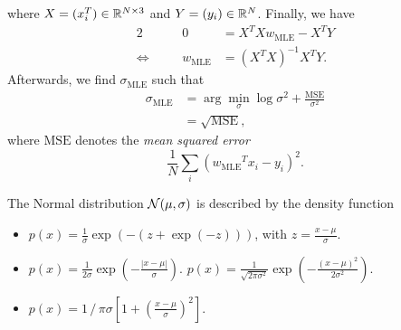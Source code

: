 \documentclass[11pt, a4paper]{article}
\begin{document}
\begin{enumerate}
\begin{solution}
        where $X = (x_i^T) \in \mathbb{R}^{N \times 3}$ and $Y = (y_i) \in \mathbb{R}^{N}$. Finally, we have
        \begin{alignat*}{2}
            && 0 & = X^T X w_{\text{MLE}} - X^T Y \\
            \Leftrightarrow \quad && w_{\text{MLE}} & = (X^T X)^{-1} X^T Y .
        \end{alignat*}
        Afterwards, we find $\sigma_{\text{MLE}}$ such that
        \begin{align*}
            \sigma_{\text{MLE}} & = \arg \min_\sigma \log \sigma^2 + \frac{\text{MSE}}{\sigma^2} \\
            & = \sqrt{\text{MSE}},
        \end{align*}
        where $\text{MSE}$ denotes the \emph{mean squared error}
        \begin{equation*}
            \frac{1}{N} \sum_i ({w_{\text{MLE}}}^T x_i - y_i)^2 .
        \end{equation*}
    \end{solution}
\end{enumerate}

\newpage

\startquiz

The Normal distribution ${\cal N}(\mu,\sigma)$ is described by the density function
\begin{itemize}
\item $p(x) = \frac{1}{\sigma} \exp\left(-(z+\exp(-z))\right)$, with $z = \frac{x-\mu}{\sigma}$.
\item $p(x) = \frac{1}{2\sigma} \exp\left(-\frac{|x-\mu|}{\sigma}\right)$.
\solitem $p(x) = \frac{1}{\sqrt{2\pi\sigma^2}} \exp\left(-\frac{(x-\mu)^2}{2\sigma^2}\right)$.
\item $p(x) = 1 \,/\, \pi\sigma \left[1 + \left(\frac{x-\mu}{\sigma}\right)^2\right]$.
\end{itemize}
\end{document}
